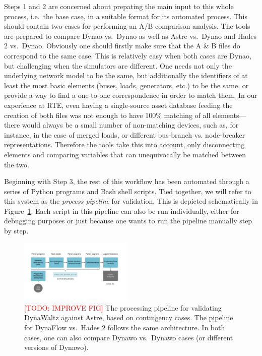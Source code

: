 \documentclass[conference]{IEEEtran}
\newcommand{\Dynawo}{Dyna\textomega o\xspace} %
\begin{document}
Steps 1 and 2 are concerned about prepating the main input to this
whole process, i.e.~the base case, in a suitable format for its
automated process. This should contain two cases for performing an A/B
comparison analysis. The tools are prepared to compare \Dynawo
vs.\ \Dynawo as well as Astre vs.\ \Dynawo and Hades 2
vs.\ \Dynawo. Obviously one should firstly make sure that the A \& B
files do correspond to the same case. This is relatively easy when
both cases are \Dynawo, but challenging when the simulators are
different.  One needs not only the underlying network model to be the
same, but additionally the identifiers of at least the most basic
elements (buses, loads, generators, etc.) to be the same, or provide a
way to find a one-to-one correspondence in order to match them.  In
our experience at RTE, even having a single-source asset database
feeding the creation of both files was not enough to have 100\%
matching of all elements---there would always be a small number of
non-matching devices, such as, for instance, in the case of merged
loads, or different bus-branch vs. node-breaker
representations. Therefore the tools take this into account, only
disconnecting elements and comparing variables that can unequivocally
be matched between the two.

Beginning with Step 3, the rest of this workflow has been automated
through a series of Python programs and Bash shell scripts. Tied
together, we will refer to this system as the \emph{process pipeline}
for validation. This is depicted schematically in
Figure~\ref{fig:pipeline1}. Each script in this pipeline can also be
run individually, either for debugging purposes or just because one
wants to run the pipeline manually step by step.

\begin{figure}
  \centering
  \includegraphics[width=0.48\textwidth]{figs/pipeline1}
  \caption{\textcolor{red}{[TODO: IMPROVE FIG]} The processing
    pipeline for validating DynaWaltz against Astre, based on
    contingency cases. The pipeline for DynaFlow vs.~Hades 2 follows
    the same architecture. In both cases, one can also compare Dynawo
    vs.~Dynawo cases (or different versions of Dynawo).}
  \label{fig:pipeline1}
\end{figure}
\end{document}

